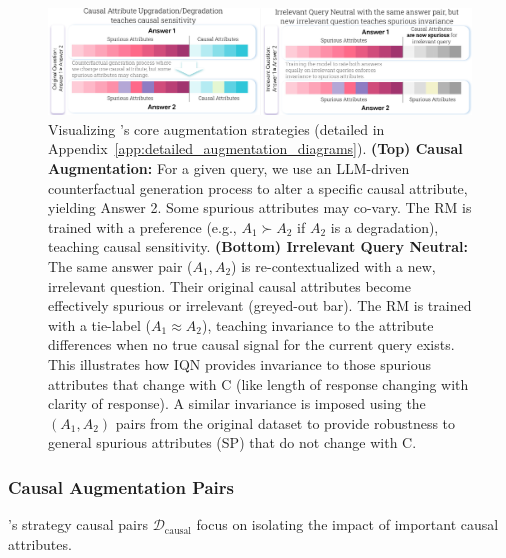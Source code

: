 \begin{figure}[!t]
  \centering
  \includegraphics[width=\linewidth]{images/CausalAugmentationProcess_Horizontal.pdf}
  \vspace{-0.2in}

  \caption{Visualizing \carma's core augmentation strategies (detailed in Appendix~\ref{app:detailed_augmentation_diagrams}).
\textbf{(Top) Causal Augmentation:} For a given query, we use an LLM-driven counterfactual generation process to alter a specific causal attribute, yielding Answer 2. Some spurious attributes may co-vary. The RM is trained with a preference (e.g., $A_1 \succ A_2$ if $A_2$ is a degradation), teaching causal sensitivity.
\textbf{(Bottom) Irrelevant Query Neutral:} The same answer pair ($A_1, A_2$) is re-contextualized with a new, irrelevant question. Their original causal attributes become effectively spurious or irrelevant (greyed-out bar). The RM is trained with a tie-label ($A_1 \approx A_2$), teaching invariance to the  attribute differences when no true causal signal for the current query exists. 
This illustrates how IQN provides invariance to those spurious attributes that change with C (like length of response changing with clarity of response).
A similar invariance is imposed using the $(A_1,A_2)$ pairs from the original dataset to provide robustness to general spurious attributes (SP) that do not change with C.\vspace{-0.1in}}
\label{fig:carma_augmentation_visual_overview}
  
\end{figure}



\subsubsection{Causal Augmentation Pairs}

\carma{}'s strategy causal pairs $\mathcal{D}_{\mathrm{causal}}$ focus on isolating the impact of important causal attributes.

